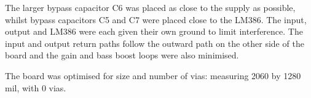 \documentclass[a4paper,10pt]{article}
\begin{document}
The larger bypass capacitor C6 was placed as close to the supply as
possible, whilst bypass capacitors C5 and C7 were placed close to the
LM386. The input, output and LM386 were each given their own ground to limit 
interference. The input and output return paths follow the outward path on the 
other side of the board and the gain and bass boost loops were also minimised.

The board was optimised for size and number of vias: measuring 2060 by 1280 mil,
with 0 vias.

\FloatBarrier
\printbibliography
\end{document}
